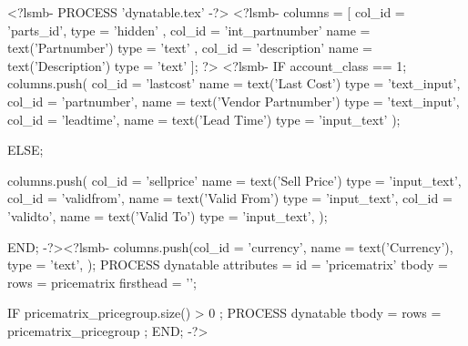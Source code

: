 \documentclass[a4paper]{article}
\begin{document}
<?lsmb- PROCESS 'dynatable.tex' -?>
<?lsmb-
    columns = [ 
              { col_id = 'parts_id',
                  type = 'hidden' },
              { col_id = 'int_partnumber'
                  name = text('Partnumber')
                  type = 'text'
                },
                { col_id = 'description'
                  name = text('Description')
                  type = 'text'
                } ];
?> <?lsmb-
     IF account_class == 1;
         columns.push(
                  {col_id = 'lastcost'
                     name = text('Last Cost') 
                     type = 'text_input'},
                  {col_id = 'partnumber',
                     name = text('Vendor Partnumber') 
                     type = 'text_input'},
                  {col_id = 'leadtime',
                     name = text('Lead Time') 
                     type = 'input_text'}
         );

     ELSE;

         columns.push(
                  {col_id = 'sellprice'
                     name = text('Sell Price') 
                     type = 'input_text'},
                  {col_id = 'validfrom',
                     name = text('Valid From') 
                     type = 'input_text'},
                  {col_id = 'validto',
                     name = text('Valid To') 
                     type = 'input_text'},
         );
                        
     END;
-?><?lsmb-
     columns.push({col_id = 'currency',
                     name = text('Currency'),
                     type = 'text'},
     );
      PROCESS dynatable
    attributes = { id = 'pricematrix' }
         tbody = { rows = pricematrix }
    firsthead = '';

   IF pricematrix_pricegroup.size() > 0 ;
     PROCESS dynatable
         tbody = { rows = pricematrix_pricegroup };
   END;
-?>
\end{document}

